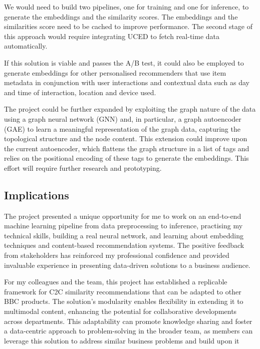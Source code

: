 We would need to build two pipelines, one for training and one for inference, to generate the embeddings and the similarity scores.
The embeddings and the similarities score need to be cached to improve performance.
The second stage of this approach would require integrating UCED to fetch real-time data automatically.

If this solution is viable and passes the A/B test,
it could also be employed to generate embeddings for other personalised recommenders that use item metadata
in conjunction with user interactions and contextual data such as day and time of interaction, location and device used.

The project could be further expanded by exploiting the graph nature of the data using a graph neural network (GNN) and,
in particular, a graph autoencoder (GAE) to learn a meaningful representation of the graph data,
capturing the topological structure and the node content.
This extension could improve upon the current autoencoder,
which flattens the graph structure in a list of tags and relies on the positional encoding of these tags to generate the embeddings.
This effort will require further research and prototyping.

\subsection{Implications}

The project presented a unique opportunity for me to work on an end-to-end machine learning pipeline from data preprocessing to inference,
practising my technical skills, building a real neural network,
and learning about embedding techniques and content-based recommendation systems.
The positive feedback from stakeholders has reinforced my professional confidence and provided invaluable experience
in presenting data-driven solutions to a business audience.

For my colleagues and the team, this project has established a replicable framework for C2C similarity recommendations
that can be adapted to other BBC products. The solution's modularity enables flexibility in
extending it to multimodal content, enhancing the potential for collaborative developments across departments.
This adaptability can promote knowledge sharing and foster a data-centric approach to problem-solving in the broader team,
as members can leverage this solution to address similar business problems and build upon it

